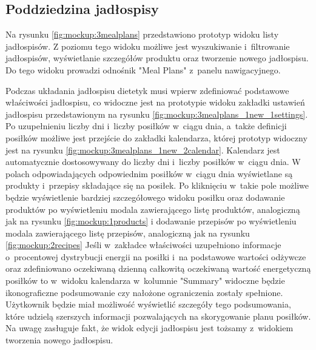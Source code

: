 


\subsection{Poddziedzina jadłospisy}

Na rysunku \ref{fig:mockup:3mealplans} przedstawiono prototyp widoku listy jadłospisów.
Z poziomu tego widoku możliwe jest wyszukiwanie i~filtrowanie jadłospisów, wyświetlanie szczegółów produktu oraz tworzenie nowego jadłospisu.
Do tego widoku prowadzi odnośnik "Meal Plans" z~panelu nawigacyjnego.


Podczas układania jadłospisu dietetyk musi wpierw zdefiniować podstawowe właściwości jadłospisu, co widoczne jest na prototypie widoku zakładki ustawień jadłospisu przedstawionym na rysunku \ref{fig:mockup:3mealplans_1new_1settings}.
Po uzupełnieniu liczby dni i~liczby posiłków w~ciągu dnia, a~także definicji posiłków możliwe jest przejście do zakładki kalendarza, której prototyp widoczny jest na rysunku \ref{fig:mockup:3mealplans_1new_2calendar}.
Kalendarz jest automatycznie dostosowywany do liczby dni i~liczby posiłków w~ciągu dnia.
W polach odpowiadających odpowiednim posiłków w~ciągu dnia wyświetlane są produkty i~przepisy składające się na posiłek.
Po kliknięciu w~takie pole możliwe będzie wyświetlenie bardziej szczegółowego widoku posiłku
oraz dodawanie produktów po wyświetleniu modala zawierającego listę produktów, analogiczną jak na rysunku \ref{fig:mockup:1products}
i dodawanie przepisów po wyświetleniu modala zawierającego listę przepisów, analogiczną jak na rysunku \ref{fig:mockup:2recipes}
Jeśli w~zakładce właściwości uzupełniono informacje o~procentowej dystrybucji energii na posiłki i~na podstawowe wartości odżywcze
oraz zdefiniowano oczekiwaną dzienną całkowitą oczekiwaną wartość energetyczną posiłków
to w~widoku kalendarza w~kolumnie "Summary" widoczne będzie ikonograficzne podsumowanie czy nałożone ograniczenia zostały spełnione.
Użytkownik będzie miał możliwość wyświetlić szczegóły tego podsumowania, które udzielą szerszych informacji pozwalających na skorygowanie planu posiłków.
Na uwagę zasługuje fakt, że widok edycji jadłospisu jest tożsamy z~widokiem tworzenia nowego jadłospisu.

